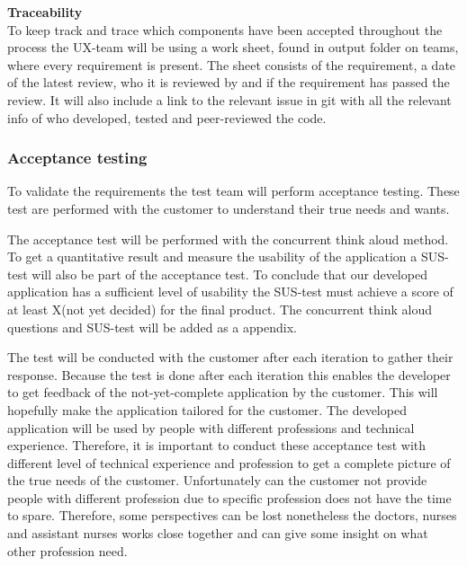 \noindent\textbf{Traceability}\\
To keep track and trace which components have been accepted throughout the process the UX-team will be using a work sheet, found in output folder on teams, where every requirement is present. The sheet consists of the requirement, a date of the latest review, who it is reviewed by and if the requirement has passed the review. It will also include a link to the relevant issue in git with all the relevant info of who developed, tested and peer-reviewed the code. \\

\subsubsection{Acceptance testing}
To validate the requirements the test team will perform acceptance testing. These test are performed with the customer to understand their true needs and wants. \newline

\noindent The acceptance test will be performed with the concurrent think aloud method. To get a quantitative result and measure the usability of the application a SUS-test will also be part of the acceptance test. To conclude that our developed application has a sufficient level of usability the SUS-test must achieve a score of at least X(not yet decided) for the final product. The concurrent think aloud questions and SUS-test will be added as a appendix.\newline

\noindent The test will be conducted with the customer after each iteration to gather their response. Because the test is done after each iteration this enables the developer to get feedback of the not-yet-complete application by the customer. This will hopefully make the application tailored for the customer. The developed application will be used by people with different professions and technical experience. Therefore, it is important to conduct these acceptance test with different level of technical experience and profession to get a complete picture of the true needs of the customer. Unfortunately can the customer not provide people with different profession due to specific profession does not have the time to spare. Therefore, some perspectives can be lost nonetheless the doctors, nurses and assistant nurses works close together and can give some insight on what other profession need. \newline

